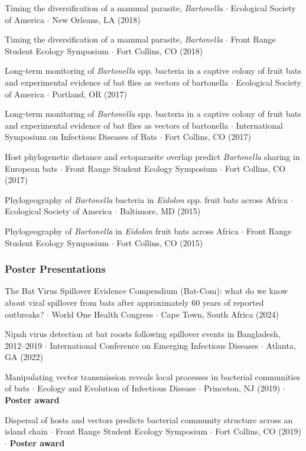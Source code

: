 \documentclass{cv}
\begin{document}
Timing the diversification of a mammal parasite, \textit{Bartonella} $\cdot$ Ecological Society of America $\cdot$ New Orleans, LA (2018)

Timing the diversification of a mammal parasite, \textit{Bartonella} $\cdot$ Front Range Student Ecology Symposium $\cdot$ Fort Collins, CO (2018)

Long-term monitoring of \textit{Bartonella} spp. bacteria in a captive colony of fruit bats and experimental evidence of bat flies as vectors of bartonella $\cdot$ Ecological Society of America $\cdot$ Portland, OR (2017)

Long-term monitoring of \textit{Bartonella} spp. bacteria in a captive colony of fruit bats and experimental evidence of bat flies as vectors of bartonella $\cdot$ International Symposium on Infectious Diseases of Bats $\cdot$ Fort Collins, CO (2017)

Host phylogenetic distance and ectoparasite overlap predict \textit{Bartonella} sharing in European bats $\cdot$ Front Range Student Ecology Symposium $\cdot$ Fort Collins, CO (2017)

Phylogeography of \textit{Bartonella} bacteria in \textit{Eidolon} spp. fruit bats across Africa $\cdot$ Ecological Society of America $\cdot$ Baltimore, MD (2015)

Phylogeography of \textit{Bartonella} in \textit{Eidolon} fruit bats across Africa $\cdot$ Front Range Student Ecology Symposium $\cdot$ Fort Collins, CO (2015)

\subsubsection*{Poster Presentations}

The Bat Virus Spillover Evidence Compendium (Bat-Com): what do we know about viral spillover from bats after approximately 60 years of reported outbreaks? $\cdot$ World One Health Congress $\cdot$ Cape Town, South Africa (2024)

Nipah virus detection at bat roosts following spillover events in Bangladesh, 2012--2019 $\cdot$ International Conference on Emerging Infectious Diseases $\cdot$ Atlanta, GA (2022)

Manipulating vector transmission reveals local processes in bacterial communities of bats $\cdot$ Ecology and Evolution of Infectious Disease $\cdot$ Princeton, NJ (2019) $\cdot$ \textbf{Poster award}

Dispersal of hosts and vectors predicts bacterial community structure across an island chain $\cdot$ Front Range Student Ecology Symposium $\cdot$ Fort Collins, CO (2019) $\cdot$ \textbf{Poster award}
\end{document}
